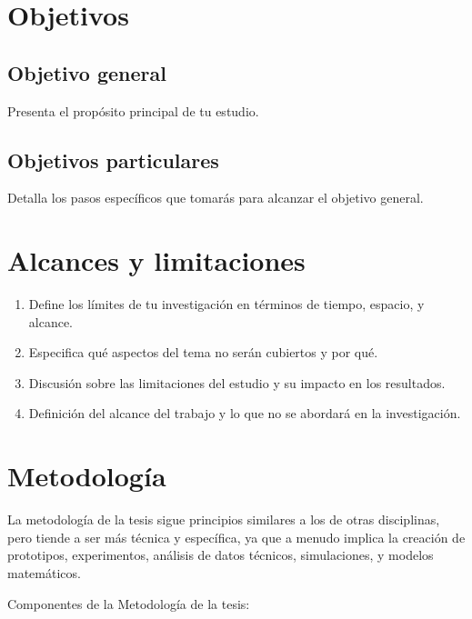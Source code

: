 \section{Objetivos}

\subsection{Objetivo general}

Presenta el propósito principal de tu estudio.

\subsection{Objetivos particulares}

Detalla los pasos específicos que tomarás para alcanzar el objetivo general.

\section{Alcances y limitaciones}

\begin{enumerate}
    \item Define los límites de tu investigación en términos de tiempo, espacio, y alcance.
    \item Especifica qué aspectos del tema no serán cubiertos y por qué.
    \item Discusión sobre las limitaciones del estudio y su impacto en los resultados.
    \item Definición del alcance del trabajo y lo que no se abordará en la investigación.

\end{enumerate}

\section{Metodología}

La metodología de la tesis sigue principios similares a los de otras disciplinas, pero tiende a ser más técnica y específica, ya que a menudo implica la creación de prototipos, experimentos, análisis de datos técnicos, simulaciones, y modelos matemáticos.

Componentes de la Metodología de la tesis:

